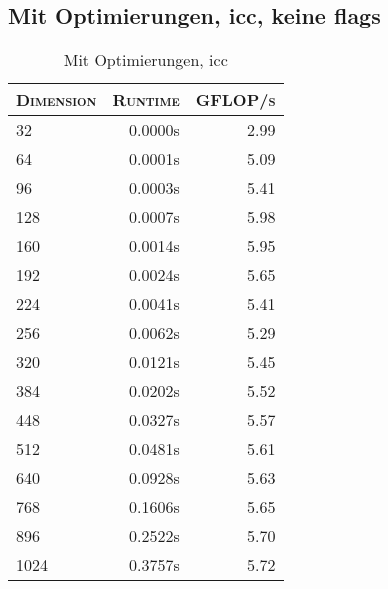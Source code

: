 \begin{table}[!htb]
\caption{Mit Optimierungen, icc}
\begin{minipage}{.5\linewidth}
\centering
\subsection{Mit Optimierungen, icc, keine flags}
\begin{tabular}{|l|r|r|}
	\hline
	\textsc{Dimension} & \textsc{Runtime} & \textsc{GFLOP/s} \\
	\hline
	\hline
	32  &  0.0000s  & 2.99 \\ 
	\hline 
	64  &  0.0001s  & 5.09 \\ 
	\hline 
	96  &  0.0003s  & 5.41 \\ 
	\hline 
	128  &  0.0007s  & 5.98 \\ 
	\hline 
	160  &  0.0014s  & 5.95 \\ 
	\hline 
	192  &  0.0024s  & 5.65 \\ 
	\hline 
	224  &  0.0041s  & 5.41 \\ 
	\hline 
	256  &  0.0062s  & 5.29 \\ 
	\hline 
	320  &  0.0121s  & 5.45 \\ 
	\hline 
	384  &  0.0202s  & 5.52 \\ 
	\hline 
	448  &  0.0327s  & 5.57 \\ 
	\hline 
	512  &  0.0481s  & 5.61 \\ 
	\hline 
	640  &  0.0928s  & 5.63 \\ 
	\hline 
	768  &  0.1606s  & 5.65 \\ 
	\hline 
	896  &  0.2522s  & 5.70 \\ 
	\hline 
	1024  &  0.3757s  & 5.72 \\ 
	\hline 
\end{tabular}
\end{minipage}%
\begin{minipage}{.5\linewidth}
\centering

\end{minipage}
\end{table}
